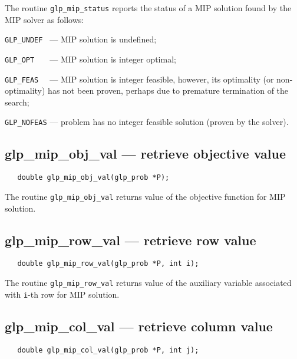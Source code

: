 \returns

The routine \verb|glp_mip_status| reports the status of a MIP solution
found by the MIP solver as follows:

\verb|GLP_UNDEF | --- MIP solution is undefined;

\verb|GLP_OPT   | --- MIP solution is integer optimal;

\verb|GLP_FEAS  | --- MIP solution is integer feasible, however, its
optimality (or non-optimality) has not been proven, perhaps due to
premature termination of the search;

\verb|GLP_NOFEAS| --- problem has no integer feasible solution (proven
by the solver).

\subsection{glp\_mip\_obj\_val --- retrieve objective value}

\synopsis

\begin{verbatim}
   double glp_mip_obj_val(glp_prob *P);
\end{verbatim}

\returns

The routine \verb|glp_mip_obj_val| returns value of the objective
function for MIP solution.

\newpage

\subsection{glp\_mip\_row\_val --- retrieve row value}

\synopsis

\begin{verbatim}
   double glp_mip_row_val(glp_prob *P, int i);
\end{verbatim}

\returns

The routine \verb|glp_mip_row_val| returns value of the auxiliary
variable associated with \verb|i|-th row for MIP solution.

\subsection{glp\_mip\_col\_val --- retrieve column value}

\synopsis

\begin{verbatim}
   double glp_mip_col_val(glp_prob *P, int j);
\end{verbatim}

